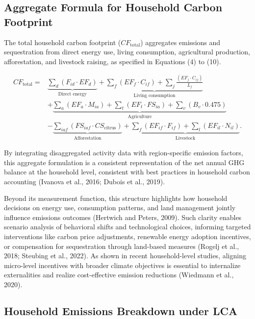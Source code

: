 \documentclass[12pt,a4paper]{article}%
\begin{document}
\subsection{Aggregate Formula for Household Carbon Footprint}

The total household carbon footprint ($CF_{\text{total}}$) aggregates emissions and sequestration from direct energy use, living consumption, agricultural production, afforestation, and livestock raising, as specified in Equations (4) to (10).

\begin{align}
CF_{\text{total}} = & \underbrace{\sum_d \left(F_{id} \cdot EF_d\right)}_{\text{Direct energy}} + 
\underbrace{\sum_f \left(EF_f \cdot C_{if}\right) + \sum_j \frac{\left(EF_j \cdot C_{ij}\right)}{L_j}}_{\text{Living consumption}} \nonumber \\
& + \underbrace{\sum_a \left(EF_a \cdot M_{ia}\right) + \sum_t \left(EF_t \cdot FS_{ia}\right) + \sum_v \left(B_v \cdot 0.475\right)}_{\text{Agriculture}} \nonumber \\
& - \underbrace{\sum_{iaf} \left(FS_{iaf} \cdot CS_{\text{citrus}}\right)}_{\text{Afforestation}} +
\underbrace{\sum_f \left(EF_{if} \cdot F_{if}\right) + \sum_l \left(EF_{il} \cdot N_{il}\right)}_{\text{Livestock}}.
\label{eq:aggregate}
\end{align}

By integrating disaggregated activity data with region-specific emission factors, this aggregate formulation is a consistent representation of the net annual GHG balance at the household level, consistent with best practices in household carbon accounting (Ivanova et al., 2016; Dubois et al., 2019). 

Beyond its measurement function, this structure highlights how household decisions on energy use, consumption patterns, and land management jointly influence emissions outcomes (Hertwich and Peters, 2009). Such clarity enables scenario analysis of behavioral shifts and technological choices, informing targeted interventions like carbon price adjustments, renewable energy adoption incentives, or compensation for sequestration through land-based measures (Rogelj et al., 2018; Steubing et al., 2022). As shown in recent household-level studies, aligning micro-level incentives with broader climate objectives is essential to internalize externalities and realize cost-effective emission reductions (Wiedmann et al., 2020).

\subsection{Household Emissions Breakdown under LCA}
\end{document}
